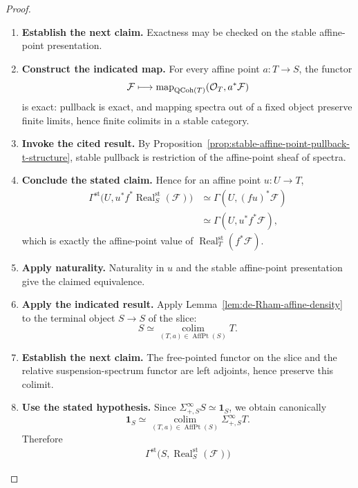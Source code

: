 \begin{proof}
\leavevmode
\begin{enumerate}[label=\textup{(\arabic*)}]
    \item \textbf{Establish the next claim.}
    Exactness may be checked on the stable affine-point presentation.
    \item \textbf{Construct the indicated map.}
    For every affine
    point \(a:T\to S\), the functor
    \[
    \mathcal F\longmapsto
    \operatorname{map}_{\operatorname{QCoh}(T)}(\mathcal O_T,a^*\mathcal F)
    \]
    is exact: pullback is exact, and mapping spectra out of a fixed object preserve
    finite limits, hence finite colimits in a stable category.
    \item \textbf{Invoke the cited result.}
    By Proposition~\ref{prop:stable-affine-point-pullback-t-structure}, stable
    pullback is restriction of the affine-point sheaf of spectra.
    \item \textbf{Conclude the stated claim.}
    Hence for an affine
    point \(u:U\to T\),
    \[
    \begin{aligned}
    \Gamma^{\mathrm{st}}
    \bigl(U,u^*f^*\operatorname{Real}^{\mathrm{st}}_S(\mathcal F)\bigr)
    &\simeq
    \Gamma(U,(fu)^*\mathcal F)\\
    &\simeq
    \Gamma(U,u^*f^*\mathcal F),
    \end{aligned}
    \]
    which is exactly the affine-point value of
    \(\operatorname{Real}^{\mathrm{st}}_T(f^*\mathcal F)\).
    \item \textbf{Apply naturality.}
    Naturality in \(u\)
    and the stable affine-point presentation give the claimed equivalence.
    \item \textbf{Apply the indicated result.}
    Apply Lemma~\ref{lem:de-Rham-affine-density} to the terminal object
    \(S\to S\) of the slice:
    \[
    S
    \simeq
    \operatorname*{colim}_{(T,a)\in\operatorname{AffPt}(S)}T.
    \]
    \item \textbf{Establish the next claim.}
    The free-pointed functor on the slice and the relative suspension-spectrum
    functor are left adjoints, hence preserve this colimit.
    \item \textbf{Use the stated hypothesis.}
    Since
    \(\Sigma^\infty_{+,S}S\simeq\mathbf1_S\), we obtain canonically
    \[
    \mathbf1_S
    \simeq
    \operatorname*{colim}_{(T,a)\in\operatorname{AffPt}(S)}
    \Sigma^\infty_{+,S}T.
    \]
    Therefore
    \[
    \begin{aligned}
    \Gamma^{\mathrm{st}}
    \bigl(S,\operatorname{Real}^{\mathrm{st}}_S(\mathcal F)\bigr)

\end{aligned}\]
\end{enumerate}
\end{proof}

